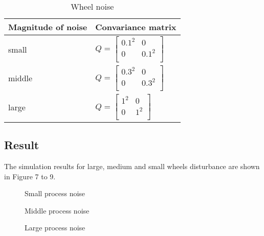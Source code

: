 \documentclass[a4paper]{article}
\begin{document}
\begin{table}[h]
    \caption{Wheel noise}
    \label{table:table2}
    \centering
    
    \begin{tabular}{|l|l|}
    \hline
    Magnitude of noise & Convariance matrix \\
    \hline \hline
    \parbox[c][\myheight][c]{0cm}{} small & $ Q =  
        \begin{bmatrix}
            0.1^2 &0 \\
            0     &0.1^2 \\ 
        \end{bmatrix}
        $ \\
    \hline
    \parbox[c][\myheight][c]{0cm}{} middle & $ Q =  
    \begin{bmatrix}
            0.3^2 &0 \\
            0     &0.3^2 \\ 
        \end{bmatrix}
        $ \\
    \hline
    \parbox[c][\myheight][c]{0cm}{} large & $ Q =  
        \begin{bmatrix}
            1^2 &0 \\
            0     &1^2 \\ 
        \end{bmatrix}
        $ \\
    \hline
    \end{tabular}
\end{table}

\subsection{Result}
%
%

The simulation results for large, medium and small wheels 
disturbance are shown in Figure 7 to 9.

\begin{figure}[H]
\centerline{}
\caption{Small process noise}
\end{figure}
\begin{figure}[H]
\centerline{}
\caption{Middle process noise}
\end{figure}
\begin{figure}[H]
\centerline{}
\caption{Large process noise}
\end{figure}
\end{document}

